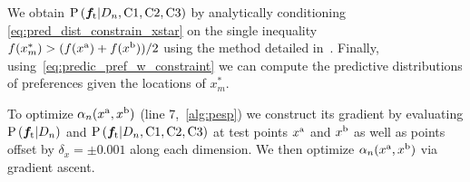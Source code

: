 We obtain $\prob{\vecf{f}[\tn{t}]|D_n, \tn{C1}, \tn{C2}, \tn{C3}}$ by
analytically conditioning \cref{eq:pred_dist_constrain_xstar} on the single
inequality $f(x_m^*) > (f(x^{\mathrm{a}}) + f(x^{\mathrm{b}}))/2$ using the method detailed
in~\citep{xu2010estimation}. Finally, using~\cref{eq:predic_pref_w_constraint} we
can compute the predictive distributions of preferences given the locations of
$x_m^*$.

To optimize $\funcil{\alpha}[n]{x^\tn{a}, x^\tn{b}}$ (line 7,~\cref{alg:pesp})
we construct its gradient by evaluating $\prob{\vecf{f}[\tn{t}] | D_n}$ and
$\prob{\vecf{f}[\tn{t}] | D_n, \tn{C1},\tn{C2},\tn{C3}}$ at test points
$x^{\mathrm{a}}$ and $x^{\mathrm{b}}$ as well as points offset by $\delta_x = \pm 0.001$
along each dimension. We then optimize $\alpha_n(x^{\mathrm{a}}, x^{\mathrm{b}})$ via
gradient ascent.
